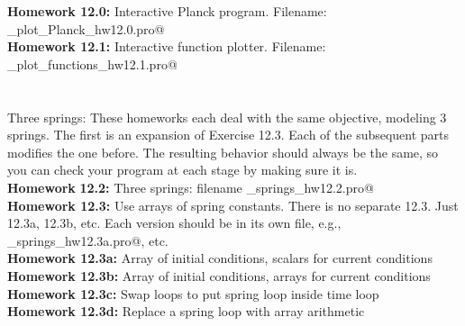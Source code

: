 \documentclass{article}
\begin{document}
\begin{spacing}{1.0}
 \textbf{Homework 12.0:} Interactive Planck program.  Filename: \verb@YourName_plot_Planck_hw12.0.pro@  \\
 \textbf{Homework 12.1:} Interactive function plotter. Filename: \verb@YourName_plot_functions_hw12.1.pro@ \\ 
 ~\\
~\\ 
 Three springs: These homeworks each deal with the same objective, modeling 3
 springs.  The first is an expansion of Exercise 12.3.  Each of the subsequent
 parts modifies the one before.  The resulting behavior should always be the
 same, so you can check your program at each stage by making sure it is.  \\
 \textbf{Homework}\textbf{  }\textbf{12.2:} Three springs: filename \verb@YourName_springs_hw12.2.pro@  \\
 \textbf{Homework 12.3:} Use arrays of spring constants.   
 There is no separate 12.3.  Just 12.3a, 12.3b, etc.  Each version should be in
 its own file, e.g., \verb@YourName_springs_hw12.3a.pro@, etc. \\
 \textbf{  }\textbf{Homework 12.3a:} Array of initial conditions, scalars for current conditions  \\
 \textbf{  }\textbf{Homework 12.3b:} Array of initial conditions, arrays for current conditions  \\
 \textbf{  }\textbf{Homework 12.3c:} Swap loops to put spring loop inside time loop  \\
 \textbf{  }\textbf{Homework 12.3d:} Replace a spring loop with array arithmetic 
   

\end{spacing}
\end{document}
